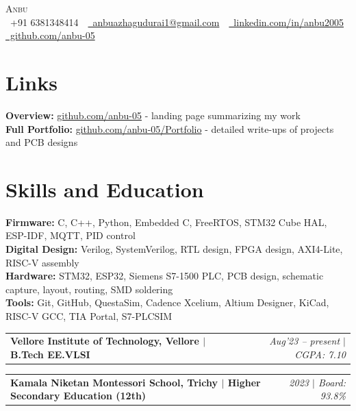 \documentclass[a4paper,11pt]{article}
\makeatletter
\newcommand{\resumeExperienceHeading}[3]{
  \vspace{-2pt}\item
    \begin{tabular*}{1.0\textwidth}[t]{l@{\extracolsep{\fill}}r}
      \textbf{#1} & \textit{\small #3}
    \end{tabular*}\vspace{-12pt}
}
\makeatother
\begin{document}
\begin{center}
    {\Huge \scshape Anbu} \\[4pt]
    \faPhone\ +91 6381348414 \,\,
    \href{mailto:anbuazhagudurai1@gmail.com}{\faEnvelope\ anbuazhagudurai1@gmail.com} \,\,
    \href{https://www.linkedin.com/in/anbu2005/}{\faLinkedin\ linkedin.com/in/anbu2005} \,\,
    \href{https://github.com/anbu-05}{\faGithub\ github.com/anbu-05}
\end{center}

\section{Links}
\begin{itemize}[leftmargin=0.15in, label={}]
  \small{\item{
    \textbf{Overview:} \href{https://github.com/anbu-05}{github.com/anbu-05} - landing page summarizing my work \\
    \textbf{Full Portfolio:} \href{https://github.com/anbu-05/Portfolio}{github.com/anbu-05/Portfolio} - detailed write-ups of projects and PCB designs \\
  }}
\end{itemize}
\vspace{-16pt}

\section{Skills and Education}
\begin{itemize}[leftmargin=0.15in, label={}]
    \small{\item{
        \textbf{Firmware:} C, C++, Python, Embedded C, FreeRTOS, STM32 Cube HAL, ESP-IDF, MQTT, PID control \\
        \textbf{Digital Design:} Verilog, SystemVerilog, RTL design, FPGA design, AXI4-Lite, RISC-V assembly \\
        \textbf{Hardware:} STM32, ESP32, Siemens S7-1500 PLC, PCB design, schematic capture, layout, routing, SMD soldering \\
        \textbf{Tools:} Git, GitHub, QuestaSim, Cadence Xcelium, Altium Designer, KiCad, RISC-V GCC, TIA Portal, S7-PLCSIM \\
    }}
    \vspace{-8pt}
    \resumeExperienceHeading
        {Vellore Institute of Technology, Vellore $|$ B.Tech EE.VLSI}{}
        {Aug'23 -- present $|$ CGPA: 7.10}
    \vspace{-16pt}
    \resumeExperienceHeading
        {Kamala Niketan Montessori School, Trichy $|$ Higher Secondary Education (12th)}{}
        {2023 $|$ Board: 93.8\%}
\end{itemize}
\vspace{-2pt}
\end{document}
